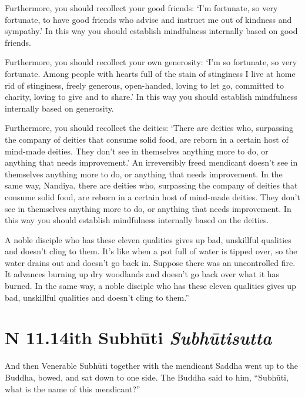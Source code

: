 \documentclass[12pt,openany]{book}%
\newcommand*{\suttatitleacronym}[1]{\smaller[2]{#1}\vspace*{.3em}}
\newcommand*{\suttatitletranslation}[1]{\linebreak{#1}}
\newcommand*{\suttatitleroot}[1]{\linebreak\smaller[2]\itshape{#1}}
\newcommand*{\tocacronym}[1]{\hspace*{-3.3em}{#1}\quad}
\newcommand*{\toctranslation}[1]{#1}
\newcommand*{\tocroot}[1]{(\textit{#1})}
\begin{document}
Furthermore, you should recollect your good friends: ‘I’m fortunate, so very fortunate, to have good friends who advise and instruct me out of kindness and sympathy.’ In this way you should establish mindfulness internally based on good friends. 

Furthermore, you should recollect your own generosity: ‘I’m so fortunate, so very fortunate. Among people with hearts full of the stain of stinginess I live at home rid of stinginess, freely generous, open-handed, loving to let go, committed to charity, loving to give and to share.’ In this way you should establish mindfulness internally based on generosity. 

Furthermore, you should recollect the deities: ‘There are deities who, surpassing the company of deities that consume solid food, are reborn in a certain host of mind-made deities. They don’t see in themselves anything more to do, or anything that needs improvement.’ An irreversibly freed mendicant doesn’t see in themselves anything more to do, or anything that needs improvement. In the same way, Nandiya, there are deities who, surpassing the company of deities that consume solid food, are reborn in a certain host of mind-made deities. They don’t see in themselves anything more to do, or anything that needs improvement. In this way you should establish mindfulness internally based on the deities. 

A noble disciple who has these eleven qualities gives up bad, unskillful qualities and doesn’t cling to them. It’s like when a pot full of water is tipped over, so the water drains out and doesn’t go back in. Suppose there was an uncontrolled fire. It advances burning up dry woodlands and doesn’t go back over what it has burned. In the same way, a noble disciple who has these eleven qualities gives up bad, unskillful qualities and doesn’t cling to them.” 

%
\section*{{\suttatitleacronym AN 11.14}{\suttatitletranslation With Subhūti }{\suttatitleroot Subhūtisutta}}
\addcontentsline{toc}{section}{\tocacronym{AN 11.14} \toctranslation{With Subhūti } \tocroot{Subhūtisutta}}

And then Venerable \textsanskrit{Subhūti} together with the mendicant Saddha went up to the Buddha, bowed, and sat down to one side. The Buddha said to him, “\textsanskrit{Subhūti}, what is the name of this mendicant?” 
\end{document}
